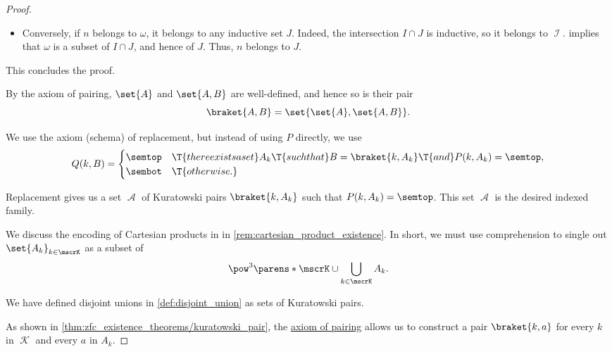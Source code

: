 \begin{proof}
\begin{itemize}
    \item Conversely, if \( n \) belongs to \( \omega \), it belongs to any inductive set \( J \). Indeed, the intersection \( I \cap J \) is inductive, so it belongs to \( \mscrI \).  implies that \( \omega \) is a subset of \( I \cap J \), and hence of \( J \). Thus, \( n \) belongs to \( J \).
  \end{itemize}

  This concludes the proof.

   By the axiom of pairing, \( \set{ A } \) and \( \set{ A, B } \) are well-defined, and hence so is their pair
  \begin{equation*}
    \braket{ A, B } = \set{ \set{ A }, \set{ A, B } }.
  \end{equation*}

   We use the axiom (schema) of replacement, but instead of using \( P \) directly, we use
  \begin{equation*}
     Q(k, B) = \begin{cases}
       \semtop &\T{there exists a set} A_k \T{such that} B = \braket{ k, A_k } \T{and} P(k, A_k) = \semtop, \\
       \sembot &\T{otherwise.}
     \end{cases}
  \end{equation*}

  Replacement gives us a set \( \mscrA \) of Kuratowski pairs \( \braket{ k, A_k } \) such that \( P(k, A_k) = \semtop \). This set \( \mscrA \) is the desired indexed family.

   We discuss the encoding of Cartesian products in  in \cref{rem:cartesian_product_existence}. In short, we must use comprehension to single out \( \set{ A_k }_{k \in \mscrK} \) as a subset of
  \begin{equation*}
    \pow^3\parens*{ \mscrK \cup \bigcup_{k \in \mscrK} A_k }.
  \end{equation*}

   We have defined disjoint unions in \cref{def:disjoint_union} as sets of Kuratowski pairs.

  As shown in \cref{thm:zfc_existence_theorems/kuratowski_pair}, the \hyperref[def:zfc/pairing]{axiom of pairing} allows us to construct a pair \( \braket{ k, a } \) for every \( k \) in \( \mscrK \) and every \( a \) in \( A_k \).


\end{proof}
